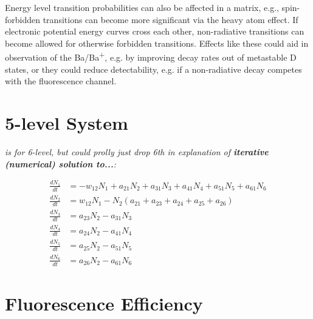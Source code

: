Energy level transition probabilities can also be affected in a matrix, e.g., spin-forbidden transitions can become more significant via the heavy atom effect.  If electronic potential energy curves cross each other, non-radiative transitions can become allowed for otherwise forbidden transitions. \cite{crepin}  Effects like these could aid in observation of the Ba/Ba\textsuperscript{+}, e.g. by improving decay rates out of metastable D states, or they could reduce detectability, e.g. if a non-radiative decay competes with the fluorescence channel.


\section{5-level System}
\label{sec:model}



\emph{\color{gray}is for 6-level, but could prolly just drop 6th in explanation of \textbf{iterative (numerical) solution to...}:}

\begin{equation}
\begin{aligned}
\frac{dN_1}{dt} &= - w_{12}N_{1} + a_{21}N_{2} + a_{31}N_{3} + a_{41}N_{4} + a_{51} N_{5} + a_{61}N_{6} \\
\frac{dN_2}{dt} &= w_{12}N_{1} - N_{2}(a_{21} + a_{23} + a_{24} + a_{25} + a_{26}) \\
\frac{dN_3}{dt} &= a_{23}N_{2} - a_{31}N_{3} \\
\frac{dN_4}{dt} &= a_{24}N_{2} - a_{41}N_{4} \\
\frac{dN_5}{dt} &= a_{25}N_{2} - a_{51}N_{5} \\
\frac{dN_6}{dt} &= a_{26}N_{2} - a_{61}N_{6}
\end{aligned}
\label{eqn:rateEqn}
\end{equation}

\section{Fluorescence Efficiency}

